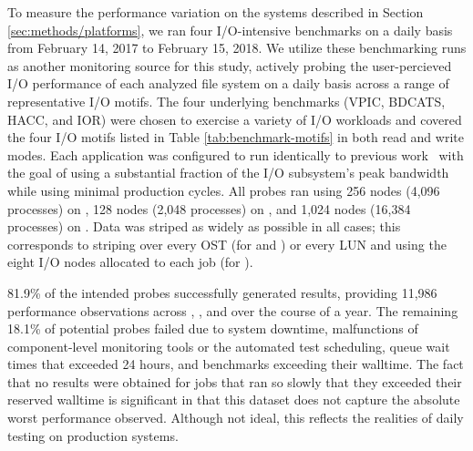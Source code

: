 To measure the performance variation on the systems described in Section \ref{sec:methods/platforms}, we ran four I/O-intensive benchmarks on a daily basis from February 14, 2017 to February 15, 2018.
We utilize these benchmarking runs as another monitoring source for this
study, actively probing the user-percieved I/O performance of each analyzed file system on a daily basis across a range of representative I/O motifs.
The four underlying benchmarks (VPIC, BDCATS, HACC, and IOR) were chosen to exercise a variety of I/O workloads and covered the four I/O motifs listed in Table \ref{tab:benchmark-motifs} in both read and write modes.
Each application was configured to run identically to previous work~\cite{Lockwood2017} with the goal of using a substantial fraction of the I/O subsystem's peak bandwidth while using minimal production cycles.
All probes ran using 256 nodes (4,096 processes) on \cori, 128 nodes (2,048 processes) on \edison, and 1,024 nodes (16,384 processes) on \mira.
Data was striped as widely as possible in all cases; this corresponds to
striping over every OST (for \cori and \edison) or every LUN and using the
eight I/O nodes allocated to each job (for \mira).  

81.9\% of the intended probes successfully generated results, providing 
11,986 performance observations across \mira, \cori, and \edison over the
course of a year.
The remaining 18.1\% of potential probes failed due to system downtime, malfunctions of component-level monitoring tools or the automated test scheduling, queue wait times that exceeded 24 hours, and benchmarks exceeding their walltime.
The fact that no results were obtained for jobs that ran so slowly that they exceeded their reserved walltime is significant in that this dataset does not capture the absolute worst performance observed.
Although not ideal, this reflects the realities of daily testing on production systems.

